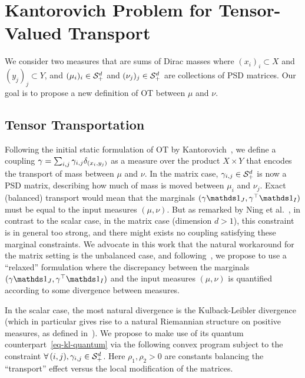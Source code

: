 
\section{Kantorovich Problem for Tensor-Valued Transport}

We consider two measures that are sums of Dirac masses
where $(x_i)_i \subset X$ and $(y_j)_j \subset Y$, and $(\mu_i)_i \in \mathcal{S}_+^d$ and $(\nu_j)_j \in \mathcal{S}_+^d$ are collections of PSD matrices. 
%
Our goal is to propose a new definition of OT between $\mu$ and $\nu$. 


\subsection{Tensor Transportation}

Following the initial static formulation of OT by Kantorovich~, we define a coupling $\gamma = \sum_{i,j}\gamma_{i,j} \delta_{(x_i,y_j)}$ as a measure over the product $X \times Y$ that encodes the transport of mass between $\mu$ and $\nu$. In the matrix case, $\gamma_{i,j} \in \mathcal{S}_+^d$ is now a PSD matrix, describing how much of mass is moved between $\mu_i$ and $\nu_j$. 
% 
Exact (balanced) transport would mean that the marginals $(\ga \ones_J,\ga^\top \ones_I)$ must be equal to the input measures $(\mu,\nu)$. But as remarked by Ning et al.~, in contrast to the scalar case, in the matrix case (dimension $d>1$), this constraint is in general too strong, and there might exists no coupling satisfying these marginal constraints.
%
We advocate in this work that the natural workaround for the matrix setting is the unbalanced case, and following~\cite{LieroMielkeSavareLong}, we propose to use a ``relaxed'' formulation where the discrepancy between the marginals $(\ga \ones_J,\ga^\top \ones_I)$ and the input measures $(\mu,\nu)$ is quantified according to some divergence between measures. 

In the scalar case, the most natural divergence is the Kulback-Leibler divergence (which in particular gives rise to a natural Riemannian structure on positive measures, as defined in~\cite{LieroMielkeSavareCourt,kondratyev2015,2016-chizat-focm}).  We propose to make use of its quantum counterpart~\eqref{eq-kl-quantum} %
%
via
  the following convex program
subject to the constraint $\forall \, (i,j), \gamma_{i,j} \in \mathcal{S}_+^d$.
Here $\rho_1,\rho_2 >0$ are constants balancing the ``transport'' effect versus the local modification of the matrices. 


